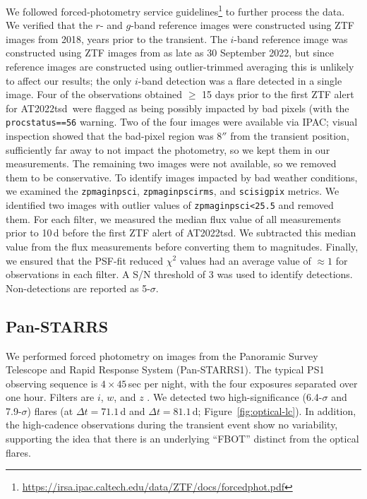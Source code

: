 \documentclass{nature_plusfigure}
\newcommand{\at}{AT2022tsd}
\begin{document}
\begin{methods}
We followed forced-photometry service guidelines\footnote{\url{https://irsa.ipac.caltech.edu/data/ZTF/docs/forcedphot.pdf}} to further process the data.
We verified that the $r$- and $g$-band reference images were constructed using ZTF images from 2018, years prior to the transient. The $i$-band reference image was constructed using ZTF images from as late as 30 September 2022, but since reference images are constructed using outlier-trimmed averaging\cite{Masci2018} this is unlikely to affect our results; the only $i$-band detection was a flare detected in a single image. 
Four of the observations obtained $\geq$ 15 days prior to the first ZTF alert for \at\ were flagged as being possibly impacted by bad pixels (with the \texttt{procstatus==56} warning.
Two of the four images were available via IPAC; visual inspection showed that the bad-pixel region was 8$''$ from the transient position, sufficiently far away to not impact the photometry, so we kept them in our measurements.
The remaining two images were not available, so we removed them to be conservative.
To identify images impacted by bad weather conditions, we examined the \texttt{zpmaginpsci}, \texttt{zpmaginpscirms}, and \texttt{scisigpix} metrics. We identified two images with outlier values of \texttt{zpmaginpsci<25.5} and removed them.
For each filter, we measured the median flux value of all measurements prior to 10\,d before the first ZTF alert of \at. We subtracted this median value from the flux measurements before converting them to magnitudes.
Finally, we ensured that the PSF-fit reduced $\chi^2$ values had an average value of $\approx1$ for observations in each filter.
A S/N threshold of 3 was used to identify detections. Non-detections are reported as 5-$\sigma$.

\subsection{Pan-STARRS}
\label{sec:panstarrs}

We performed forced photometry on images from the Panoramic Survey Telescope and Rapid Response System (Pan-STARRS1\cite{Chambers2016}).
The typical PS1 observing sequence is $4\times45$\,sec per night, with the
four exposures separated over one hour. Filters are $i$, $w$, and $z$ \cite{Tonry2012}.
We detected two high-significance (6.4-$\sigma$ and 7.9-$\sigma$) flares (at $\Delta t=71.1$\,d and $\Delta t=81.1\,$d; Figure~\ref{fig:optical-lc}).
In addition, the high-cadence observations during the transient event show no variability, supporting the idea that there is an underlying ``FBOT'' distinct from the optical flares.


\end{methods}
\end{document}
